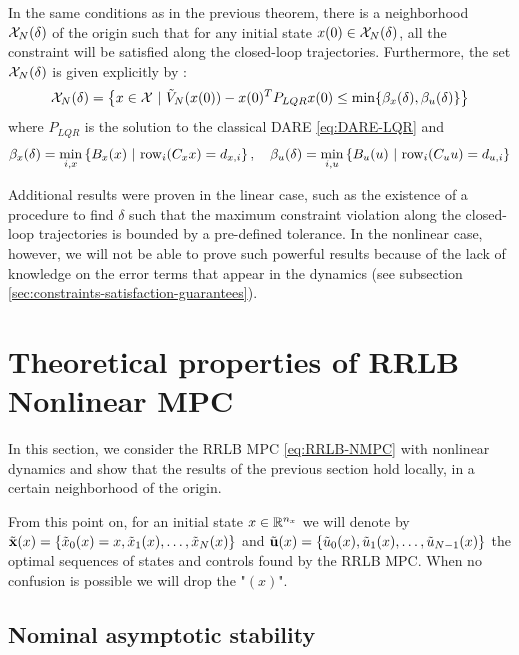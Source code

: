 \documentclass[12pt]{article}
\begin{document}
\begin{theorem}
	\label{constraint-satisfaction-guarantee-linear-case}
	In the same conditions as in the previous theorem, there is a neighborhood $\cal{X}_N(\delta)$ of the origin such that for any initial state $x(0)\in\cal{X}_N(\delta)$, all the constraint will be satisfied along the closed-loop trajectories.
	Furthermore, the set $\cal{X}_N(\delta)$ is given explicitly by :
	$$\cal{X}_N(\delta)=\left\{x\in\cal{X}~|~\tilde{V}_N(x(0))-x(0)^TP_{LQR}x(0)\leq\min\{\beta_x(\delta),\beta_u(\delta)\}\right\}$$
	where $P_{LQR}$ is the solution to the classical DARE \ref{eq:DARE-LQR} and
	$$\beta_x(\delta)=\underset{i,x}{\min}\left\{ B_x(x)~|~\rm{row}_i(C_xx)=d_{x,i} \right\},\quad \beta_u(\delta)=\underset{i,u}{\min}\left\{ B_u(u)~|~\rm{row}_i(C_uu)=d_{u,i} \right\}$$
\end{theorem}

\noindent Additional results were proven in the linear case, such as the existence of a procedure to find $\delta$ such that the maximum constraint violation along the closed-loop trajectories is bounded by a pre-defined tolerance.
In the nonlinear case, however, we will not be able to prove such powerful results because of the lack of knowledge on the error terms that appear in the dynamics (see subsection \ref{sec:constraints-satisfaction-guarantees}).

\section{Theoretical properties of RRLB Nonlinear MPC}\label{sec:RRLB-theoretical-properties}

In this section, we consider the RRLB MPC \ref{eq:RRLB-NMPC} with nonlinear dynamics and show that the results of the previous section hold locally, in a certain neighborhood of the origin.

From this point on, for an initial state $x\in\R^{n_x}$ we will denote by \newline
$\tilde{\bf{x}}(x)=\left\{ \tilde{x}_0(x)=x,\tilde{x}_1(x),\dots,\tilde{x}_N(x) \right\}$ and $\tilde{\bf{u}}(x)=\left\{ \tilde{u}_0(x),\tilde{u}_1(x),\dots,\tilde{u}_{N-1}(x) \right\}$ the optimal sequences of states and controls found by the RRLB MPC.
When no confusion is possible we will drop the "$(x)$".

\subsection{Nominal asymptotic stability}\label{sec:RRLB-nominal-stability}
\end{document}
